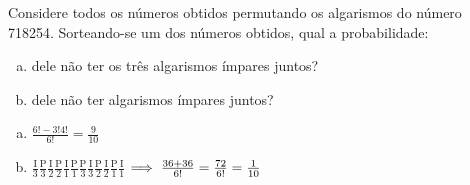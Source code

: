 \begin{ex}
 Considere todos os números obtidos permutando os algarismos do número 718254. Sorteando-se um dos números obtidos, qual a probabilidade:
    \begin{enumerate}[(a)]
    \item dele não ter os três algarismos ímpares juntos?
    \item dele não ter algarismos ímpares juntos?
    \end{enumerate}
     \begin{sol}
         \phantom{A} 
       \begin{enumerate} [(a)]
           \item $\frac{6!-3!4!}{6!}=\frac{9}{10}$
           \item $\frac{\mathrm{I}}{3}\frac{\mathrm{P}}{3}\frac{\mathrm{I}}{2}\frac{\mathrm{P}}{2}\frac{\mathrm{I}}{1}\frac{\mathrm{P}}{1}$\hspace{0.3cm}$\frac{\mathrm{P}}{3}\frac{\mathrm{I}}{3}\frac{\mathrm{P}}{2}\frac{\mathrm{I}}{2}\frac{\mathrm{P}}{1}\frac{\mathrm{I}}{1}$\hspace{0.3cm} $\Longrightarrow \hspace{0.1cm} \frac{36+36}{6!}=\frac{72}{6!}=\frac{1}{10}$
       \end{enumerate}
     \end{sol}
\end{ex}
